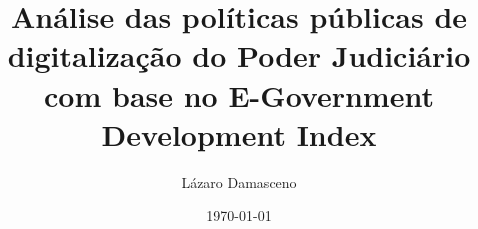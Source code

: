 \documentclass[12pt, a4paper]{report}
\begin{document}
\title{Análise das políticas públicas de digitalização do Poder Judiciário com base no E-Government Development Index} 

\author{Lázaro Damasceno}
\date{\today}
\maketitle

\listoffigures
\listoftables
\tableofcontents









\end{document}
